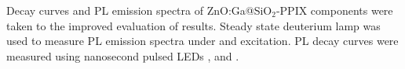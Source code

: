     Decay curves and PL emission spectra of ZnO:Ga@SiO$_{2}$-PPIX components were taken to the improved evaluation of results. Steady state deuterium lamp was used to measure PL emission spectra under  and  excitation. PL decay curves were measured using nanosecond pulsed LEDs ,  and . 



    
    